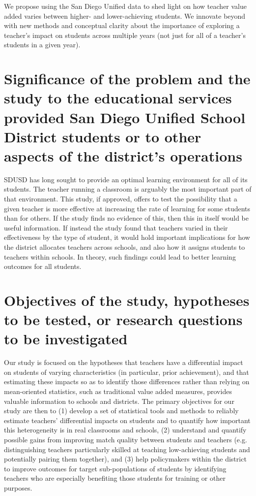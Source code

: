 \documentclass[letterpaper,12pt]{article}
\begin{document}
We propose using the San Diego Unified data to shed light on how teacher value added varies between higher- and lower-achieving students. We innovate beyond \citet{lockwood2007sensitivity} with new methods and conceptual clarity about the importance of exploring a teacher's impact on students across multiple years (not just for all of a teacher's students in a given year).





\section{Significance of the problem and the study to the educational services provided San Diego Unified School District students or to other aspects of the district’s operations}
SDUSD has long sought to provide an optimal learning environment for all of its students. The teacher running a classroom is arguably the most important part of that environment. This study, if approved, offers to test the possibility that a given teacher is more effective at increasing the rate of learning for some students than for others. If the study finds no evidence of this, then this in itself would be useful information.  If instead the study found that teachers varied in their effectiveness by the type of student, it would hold important implications for how the district allocates teachers across schools, and also how it assigns students to teachers within schools. In theory, such findings could lead to better learning outcomes for all students. 





\section{Objectives of the study, hypotheses to be tested, or research questions to be investigated}
Our study is focused on the hypotheses that teachers have a differential impact on students of varying characteristics (in particular, prior achievement), and that estimating these impacts so as to identify those differences rather than relying on mean-oriented statistics, such as traditional value added measures, provides valuable information to schools and districts. The primary objectives for our study are then to (1) develop a set of statistical tools and methods to reliably estimate teachers' differential impacts on students and to quantify how important this heterogeneity is in real classrooms and schools, (2) understand and quantify possible gains from improving match quality between students and teachers (e.g. distinguishing teachers particularly skilled at teaching low-achieving students and potentially pairing them together), and (3) help policymakers within the district to improve outcomes for target sub-populations of students by identifying teachers who are especially benefiting those students for training or other purposes.
\end{document}

